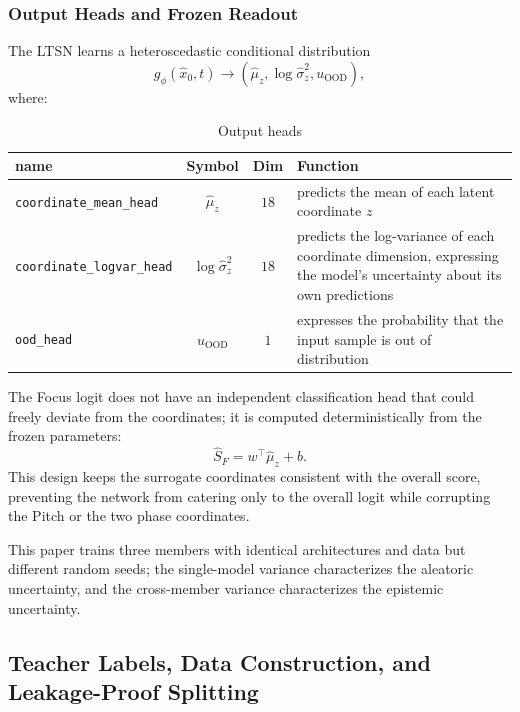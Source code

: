 \documentclass{article}
\begin{document}
\subsubsection{Output Heads and Frozen Readout}

The LTSN learns a heteroscedastic conditional distribution
\begin{equation}
g_{\phi}(\hat{x}_0,t)\longrightarrow
(\hat{\mu}_z,\log\hat{\sigma}_z^2,u_{\mathrm{OOD}}),
\end{equation}
where:
\begin{table}[htbp]
\centering
\caption{Output heads}
\renewcommand{\arraystretch}{1.5}
\begin{tabular}{lccp{8cm}}
\toprule
name & Symbol & Dim & Function  \\
\midrule
\texttt{coordinate\_mean\_head}     & $\hat{\mu}_z$      & $18$    & predicts the mean of each latent coordinate $z$   \\
\texttt{coordinate\_logvar\_head}   & $\log\hat{\sigma}_z^2$      & $18$    & predicts the log-variance of each coordinate dimension, expressing the model's uncertainty about its own predictions   \\
\texttt{ood\_head}     & $u_{\mathrm{OOD}}$      & $1$        & expresses the probability that the input sample is out of distribution     \\
\bottomrule
\end{tabular}
\end{table}

The Focus logit does not have an independent classification head that could freely deviate from the coordinates; it is computed deterministically from the frozen parameters:
\begin{equation}
\hat{S}_F=w^{\top}\hat{\mu}_z+b.
\label{eq:ltsn_frozen_readout}
\end{equation}
This design keeps the surrogate coordinates consistent with the overall score, preventing the network from catering only to the overall logit while corrupting the Pitch or the two phase coordinates.

This paper trains three members with identical architectures and data but different random seeds; the single-model variance characterizes the aleatoric uncertainty, and the cross-member variance characterizes the epistemic uncertainty.

\subsection{Teacher Labels, Data Construction, and Leakage-Proof Splitting}
\end{document}

